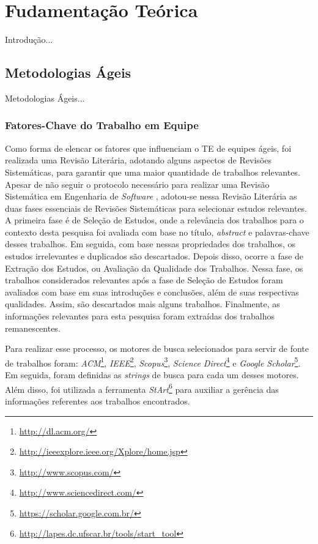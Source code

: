 \chapter{Fudamentação Teórica}
\label{fundamentacao}

{\color{red} Introdução...}

\section{Metodologias Ágeis}
\label{fundamentacao:ageis}

{\color{red} Metodologias Ágeis...}

\subsection{Fatores-Chave do Trabalho em Equipe}
\label{fundamentacao:ageis:fatores}

Como forma de elencar os fatores que influenciam o TE de equipes ágeis, foi realizada uma Revisão Literária, adotando alguns aspectos de Revisões Sistemáticas, para garantir que uma maior quantidade de trabalhos relevantes. Apesar de não seguir o protocolo necessário para realizar uma Revisão Sistemática em Engenharia de \textit{Software} \cite{kitchenhan}, adotou-se nessa Revisão Literária as duas fases essenciais de Revisões Sistemáticas para selecionar estudos relevantes. A primeira fase é de Seleção de Estudos, onde a relevância dos trabalhos para o contexto desta pesquisa foi avaliada com base no título, \textit{abstract} e palavras-chave desses trabalhos. Em seguida, com base nessas propriedades dos trabalhos, os estudos irrelevantes e duplicados são descartados. Depois disso, ocorre a fase de Extração dos Estudos, ou Avaliação da Qualidade dos Trabalhos. Nessa fase, os trabalhos considerados relevantes após a fase de Seleção de Estudos foram avaliados com base em suas introduções e conclusões, além de suas respectivas qualidades. Assim, são descartados mais alguns trabalhos. Finalmente, as informações relevantes para esta pesquisa foram extraídas dos trabalhos remanescentes.

Para realizar esse processo, os motores de busca selecionados para servir de fonte de trabalhos foram: \textit{ACM}\footnote{\url{http://dl.acm.org/}}, \textit{IEEE}\footnote{\url{http://ieeexplore.ieee.org/Xplore/home.jsp}}, \textit{Scopus}\footnote{\url{http://www.scopus.com/}}, \textit{Science Direct}\footnote{\url{http://www.sciencedirect.com/}} e \textit{Google Scholar}\footnote{\url{https://scholar.google.com.br/}}. Em seguida, foram definidas as \textit{strings} de busca para cada um desses motores. Além disso, foi utilizada a ferramenta \textit{StArt}\footnote{\url{http://lapes.dc.ufscar.br/tools/start_tool}} para auxiliar a gerência das informações referentes aos trabalhos encontrados.

